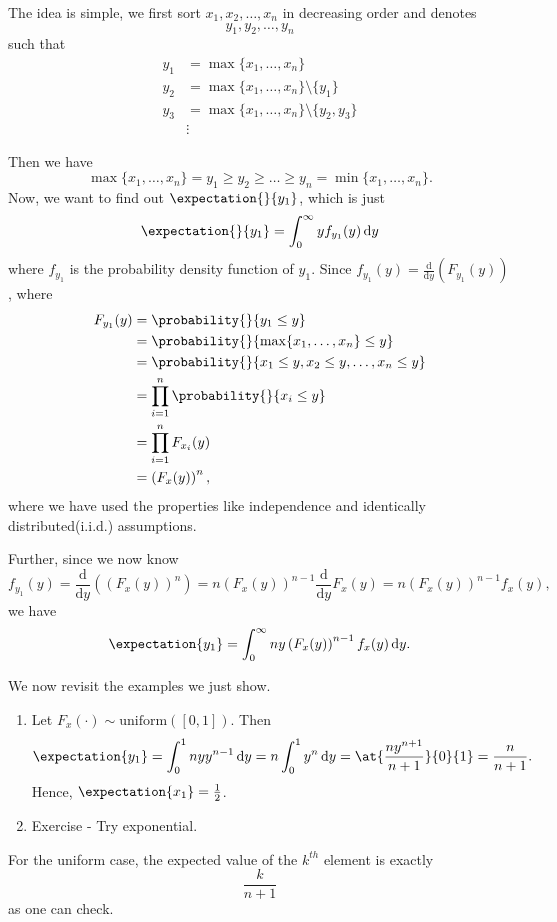 \hr

The idea is simple, we first sort \(x_1, x_2, \ldots , x_n\) in decreasing order and denotes
\[
	y_1, y_2, \ldots , y_{n}
\]
such that
\[
	\begin{split}
		y_1 &= \max\{x_1, \ldots , x_n\}\\
		y_2 &= \max\{x_1, \ldots , x_n\}\setminus \{y_1\}\\
		y_3 &= \max\{x_1, \ldots , x_n\}\setminus \{y_2, y_3\}\\
		&\vdots
	\end{split}
\]

Then we have
\[
	\max\{x_1, \ldots , x_n\} = y_1\geq y_2\geq \ldots \geq y_n = \min\{x_1, \ldots , x_{n}\}.
\]
Now, we want to find out \(\expectation{}{y_1} \), which is just
\[
	\expectation{}{y_1} = \int_0^{\infty } y f_{y_1}(y)\,\mathrm{d}y
\]
where \(f_{y_1}\) is the probability density function of \(y_1\). Since \(f_{y_1}(y) = \frac{\mathrm{d}}{\mathrm{d}y} \left(F_{y_1}(y)\right)\),
where
\[
	\begin{split}
		F_{y_1}(y) &= \probability{}{y_1\leq y}\\
		&= \probability{}{\max\{x_1, \ldots , x_{n}\}\leq y}\\
		&= \probability{}{x_1\leq y, x_2\leq y, \ldots , x_n\leq y}\\
		&= \prod\limits_{i=1}^{n} \probability{}{x_{i}\leq y}\\
		&= \prod\limits_{i=1}^{n} F_{x_{i}}(y)\\
		&= \left(F_x(y)\right)^n,
	\end{split}
\]
where we have used the properties like independence and identically distributed(i.i.d.) assumptions.

Further, since we now know
\[
	f_{y_1}(y) = \frac{\mathrm{d}}{\mathrm{d}y}\left(\left(F_x(y)\right)^n\right) = n \left(F_x(y)\right)^{n-1} \frac{\mathrm{d}}{\mathrm{d}y} F_x(y) = n\left(F_{x}(y)\right)^{n-1}f_x(y),
\]
we have
\[
	\expectation{y_1} = \int_0^{\infty }n y \left(F_{x}(y)\right)^{n-1} f_x(y)\,\mathrm{d}y.
\]

\begin{eg}
	We now revisit the examples we just show.
	\begin{enumerate}
		\item Let \(F_{x}(\cdot)\sim \mathrm{uniform}([0,1]) \). Then
		      \[
			      \expectation{y_1} = \int_0^1 n y y^{n-1}\,\mathrm{d}y = n\int_0^1 y^n \,\mathrm{d}y = \at{\frac{ny^{n+1}}{n+1}}{0}{1} = \frac{n}{n+1} .
		      \]
		      Hence, \(\expectation{x_1}= \frac{1}{2} \).
		\item Exercise - Try exponential.
	\end{enumerate}
\end{eg}
\begin{remark}
	For the uniform case, the expected value of the \(k^{th}\) element is exactly
	\[
		\frac{k}{n+1}
	\]
	as one can check.
\end{remark}



